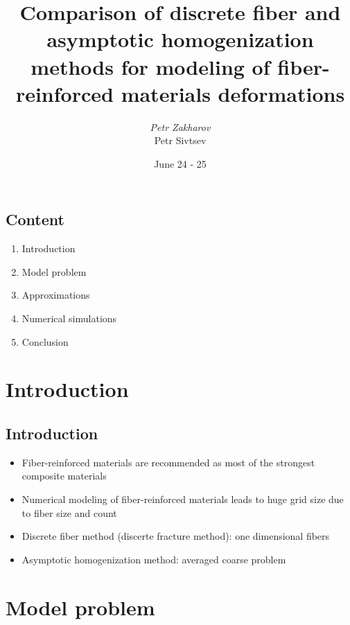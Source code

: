 \documentclass[compress,pdf,mathserif]{beamer}
\title{Comparison of discrete fiber and asymptotic homogenization methods for modeling of fiber-reinforced materials deformations}
\author{\textit{Petr Zakharov}\\Petr Sivtsev}
\institute{Multiscale and high-performance computing for multiphysical problems 2019}
\date{June 24 - 25}
\begin{document}
\maketitle

\subsection{Content}
\begin{frame}
\begin{enumerate}
\item Introduction
\item Model problem
\item Approximations
\item Numerical simulations
\item Conclusion
\end{enumerate}
\end{frame}

\section{Introduction}
\subsection{Introduction}
\begin{frame}
    \begin{itemize}
        \item Fiber-reinforced materials are recommended as most of the strongest composite materials
        \item Numerical modeling of fiber-reinforced materials leads to huge grid size due to fiber size and count
        \item Discrete fiber method (discerte fracture method): one dimensional fibers
        \item Asymptotic homogenization method: averaged coarse problem
    \end{itemize}
\end{frame}

\section{Model problem}
\end{document}

